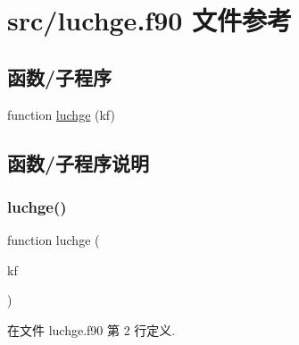 \hypertarget{luchge_8f90}{}\section{src/luchge.f90 文件参考}
\label{luchge_8f90}
\subsection*{函数/子程序}
\begin{DoxyCompactItemize}
\item 
function \mbox{\hyperlink{luchge_8f90_a4732f265c9aa09be1602d6fe8db952c6}{luchge}} (kf)
\end{DoxyCompactItemize}


\subsection{函数/子程序说明}
\mbox{\label{luchge_8f90_a4732f265c9aa09be1602d6fe8db952c6}} 
\subsubsection{\texorpdfstring{luchge()}{luchge()}}
{\footnotesize\ttfamily function luchge (\begin{DoxyParamCaption}\item[{}]{kf }\end{DoxyParamCaption})}



在文件 luchge.\+f90 第 2 行定义.

